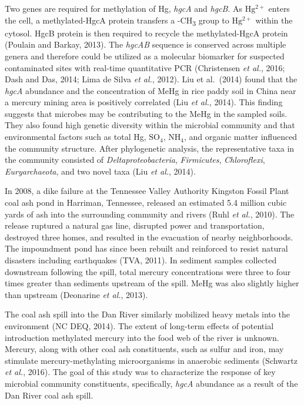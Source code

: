 \documentclass[ms, hidelinks]{uncgdissertationexp}
\theoremstyle{plain}
\theoremstyle{definition}
\theoremstyle{remark}
\begin{document}
Two genes are required for methylation of Hg, \emph{hgcA} and \emph{hgcB}. As \(\mathrm{Hg^{2+}}\) enters the cell, a methylated-HgcA protein transfers a -CH\textsubscript{3} group to \(\mathrm{Hg^{2+}}\) within the cytosol. HgcB protein is then required to recycle the methylated-HgcA protein (Poulain and Barkay, 2013). The \emph{hgcAB} sequence is conserved across multiple genera and therefore could be utilized as a molecular biomarker for suspected contaminated sites with real-time quantitative PCR (Christensen \emph{et al.}, 2016; Dash and Das, 2014; Lima de Silva \emph{et al.}, 2012). Liu et al.~(2014) found that the \emph{hgcA} abundance and the concentration of MeHg in rice paddy soil in China near a mercury mining area is positively correlated (Liu \emph{et al.}, 2014). This finding suggests that microbes may be contributing to the MeHg in the sampled soils. They also found high genetic diversity within the microbial community and that environmental factors such as total Hg, \(\mathrm{SO_4}\), \(\mathrm{NH_4}\), and organic matter influenced the community structure. After phylogenetic analysis, the representative taxa in the community consisted of \emph{Deltaproteobacteria}, \emph{Firmicutes}, \emph{Chloroflexi}, \emph{Euryarchaeota}, and two novel taxa (Liu \emph{et al.}, 2014).

In 2008, a dike failure at the Tennessee Valley Authority Kingston Fossil Plant coal ash pond in Harriman, Tennessee, released an estimated 5.4 million cubic yards of ash into the surrounding community and rivers (Ruhl \emph{et al.}, 2010). The release ruptured a natural gas line, disrupted power and transportation, destroyed three homes, and resulted in the evacuation of nearby neighborhoods. The impoundment pond has since been rebuilt and reinforced to resist natural disasters including earthquakes (TVA, 2011). In sediment samples collected downstream following the spill, total mercury concentrations were three to four times greater than sediments upstream of the spill. MeHg was also slightly higher than upstream (Deonarine \emph{et al.}, 2013).

The coal ash spill into the Dan River similarly mobilized heavy metals into the environment (NC DEQ, 2014). The extent of long-term effects of potential introduction methylated mercury into the food web of the river is unknown. Mercury, along with other coal ash constituents, such as sulfur and iron, may stimulate mercury-methylating microorganisms in anaerobic sediments (Schwartz \emph{et al.}, 2016). The goal of this study was to characterize the response of key microbial community constituents, specifically, \emph{hgcA} abundance as a result of the Dan River coal ash spill.
\end{document}
